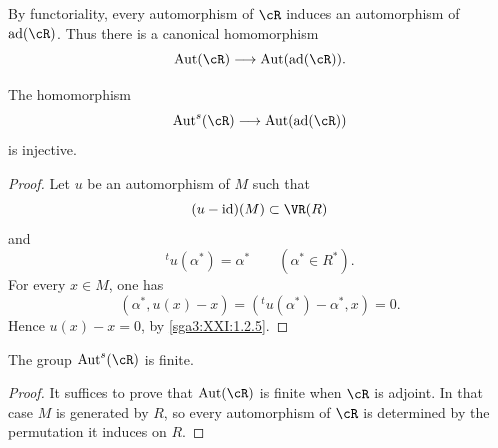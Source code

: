 By functoriality, every automorphism of \(\cR\) induces an
automorphism of \(\operatorname{ad}(\cR)\). Thus there is a
canonical homomorphism
\[
 \operatorname{Aut}(\cR)\longrightarrow
 \operatorname{Aut}(\operatorname{ad}(\cR)).
\]

\begin{lemma}\label{sga3:XXI:6.7.6}
The homomorphism
\[
 \operatorname{Aut}^{s}(\cR)\longrightarrow
 \operatorname{Aut}(\operatorname{ad}(\cR))
\]
is injective.
\end{lemma}

\begin{proof}
Let \(u\) be an automorphism of \(M\) such that
\[
 (u-\operatorname{id})(M)\subset\VR(R)
\]
and
\[
 {}^tu(\alpha^\ast)=\alpha^\ast
 \qquad(\alpha^\ast\in R^\ast).
\]
For every \(x\in M\), one has
\[
 (\alpha^\ast,u(x)-x)
 =({}^tu(\alpha^\ast)-\alpha^\ast,x)=0.
\]
Hence \(u(x)-x=0\), by \ref{sga3:XXI:1.2.5}.
\end{proof}

\begin{lemma}\label{sga3:XXI:6.7.7}
The group \(\operatorname{Aut}^{s}(\cR)\) is finite.
\end{lemma}

\begin{proof}
It suffices to prove that \(\operatorname{Aut}(\cR)\) is finite when
\(\cR\) is adjoint. In that case \(M\) is generated by \(R\), so
every automorphism of \(\cR\) is determined by the permutation it
induces on \(R\).
\end{proof}
